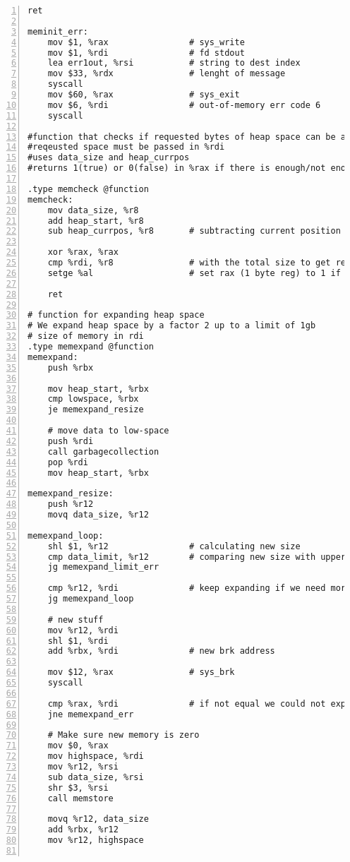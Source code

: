 \documentclass{article}
\begin{document}
\begin{lstlisting}[numbers=left, firstnumber=1]
	ret

meminit_err: 
	mov $1, %rax 			    # sys_write
	mov $1, %rdi			    # fd stdout
	lea err1out, %rsi		    # string to dest index
	mov $33, %rdx			    # lenght of message 
	syscall 
	mov $60, %rax			    # sys_exit
	mov $6, %rdi 			    # out-of-memory err code 6
	syscall

#function that checks if requested bytes of heap space can be aquired. 
#reqeusted space must be passed in %rdi
#uses data_size and heap_currpos
#returns 1(true) or 0(false) in %rax if there is enough/not enough space 

.type memcheck @function
memcheck:    
	mov data_size, %r8
    add heap_start, %r8
	sub heap_currpos, %r8	    # subtracting current position in the heap
    
    xor %rax, %rax
	cmp %rdi, %r8			    # with the total size to get remaining space
	setge %al		            # set rax (1 byte reg) to 1 if enough

	ret

# function for expanding heap space 
# We expand heap space by a factor 2 up to a limit of 1gb 
# size of memory in rdi
.type memexpand @function
memexpand:   
    push %rbx
    
    mov heap_start, %rbx
    cmp lowspace, %rbx
    je memexpand_resize
    
    # move data to low-space
    push %rdi
    call garbagecollection
    pop %rdi
    mov heap_start, %rbx
    
memexpand_resize: 
    push %r12    
	movq data_size, %r12
    
memexpand_loop:	
	shl $1, %r12				# calculating new size 
	cmp data_limit, %r12 		# comparing new size with upper limit
	jg memexpand_limit_err
    
    cmp %r12, %rdi              # keep expanding if we need more space
    jg memexpand_loop

    # new stuff    
    mov %r12, %rdi
    shl $1, %rdi 
    add %rbx, %rdi              # new brk address
    
    mov $12, %rax               # sys_brk
    syscall
    
    cmp %rax, %rdi              # if not equal we could not expand heap
    jne memexpand_err
    
    # Make sure new memory is zero
    mov $0, %rax
    mov highspace, %rdi
    mov %r12, %rsi
    sub data_size, %rsi     
    shr $3, %rsi
    call memstore
    
    movq %r12, data_size
    add %rbx, %r12
    mov %r12, highspace
    

\end{lstlisting}
\end{document}
